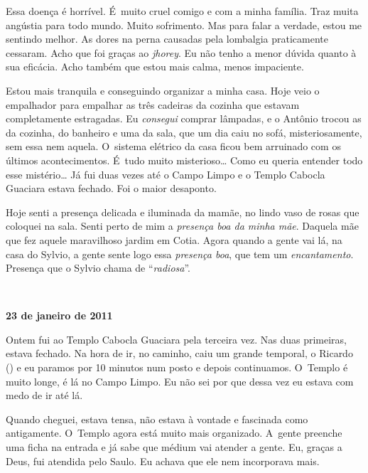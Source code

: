 Essa doença é horrível. É~muito cruel comigo e com a minha família. Traz
muita angústia para todo mundo. Muito sofrimento. Mas para falar a
verdade, estou me sentindo melhor. As dores na perna causadas pela
lombalgia praticamente cessaram. Acho que foi graças ao \emph{jhorey}.
Eu não tenho a menor dúvida quanto à sua eficácia. Acho também que estou
mais calma, menos impaciente.

Estou mais tranquila e conseguindo organizar a minha casa. Hoje veio o
empalhador para empalhar as três cadeiras da cozinha que estavam
completamente estragadas. Eu \emph{consegui} comprar lâmpadas, e o
Antônio trocou as da cozinha, do banheiro e uma da sala, que um dia caiu
no sofá, misteriosamente, sem essa nem aquela. O~sistema elétrico da
casa ficou bem arruinado com os últimos acontecimentos. É~tudo muito
misterioso… Como eu queria entender todo esse mistério… Já
fui duas vezes até o Campo Limpo e o Templo Cabocla Guaciara estava
fechado. Foi o maior desaponto.

Hoje senti a presença delicada e iluminada da mamãe, no lindo vaso de
rosas que coloquei na sala. Senti perto de mim a \emph{presença boa da
minha mãe}. Daquela mãe que fez aquele maravilhoso jardim em Cotia.
Agora quando a gente vai lá, na casa do Sylvio, a gente sente logo essa
\emph{presença boa}, que tem um \emph{encantamento}. Presença que o
Sylvio chama de ``\emph{radiosa}''.

\begin{center}\asterisc{}​\end{center}

\begin{flushright}\textbf{}\end{flushright}

\begin{flushright}\textbf{23 de janeiro de 2011}\end{flushright}


Ontem fui ao Templo Cabocla Guaciara pela terceira vez. Nas duas
primeiras, estava fechado. Na hora de ir, no caminho, caiu um grande
temporal, o Ricardo () e eu paramos por 10 minutos num posto e depois
continuamos. O~Templo é muito longe, é lá no Campo Limpo. Eu não sei por
que dessa vez eu estava com medo de ir até lá.

Quando cheguei, estava tensa, não estava à vontade e fascinada como
antigamente. O~Templo agora está muito mais organizado. A~gente preenche
uma ficha na entrada e já sabe que médium vai atender a gente. Eu,
graças a Deus, fui atendida pelo Saulo. Eu achava que ele nem
incorporava mais.


